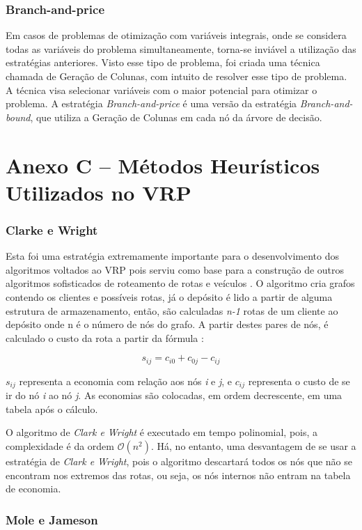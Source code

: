 \subsection*{Branch-and-price}
Em casos de problemas de otimização com variáveis integrais, onde se considera todas as variáveis do problema simultaneamente, torna-se inviável a utilização das estratégias anteriores. Visto esse tipo de problema, foi criada uma técnica chamada de Geração de Colunas, com intuito de resolver esse tipo de problema. A técnica visa selecionar variáveis com o maior potencial para otimizar o problema. A estratégia \emph{Branch-and-price} é uma versão da estratégia \emph{Branch-and-bound}, que utiliza a Geração de Colunas  em cada nó da árvore de decisão.

\chapter*{Anexo C -- Métodos Heurísticos Utilizados no VRP}
\label{anexo-metodos-heuristicos}
\subsection*{Clarke e Wright}
Esta foi uma estratégia extremamente importante para o desenvolvimento dos algoritmos voltados ao VRP pois serviu como base para a construção de outros algoritmos sofisticados de roteamento de rotas e veículos \cite{milton-nascimento}. O algoritmo cria grafos contendo os clientes e possíveis rotas, já o depósito é lido a partir de alguma estrutura de armazenamento, então, são calculadas \emph{n-1} rotas de um cliente ao depósito onde n é o número de nós do grafo. A partir destes pares de nós, é calculado  o custo da rota a partir da fórmula \cite[p. 32]{maxwell}: 

\[ s_{ij} = c_{i0} + c_{0j} - c_{ij} \]

$s_{ij}$ representa a economia com relação aos nós \emph{i} e \emph{j}, e $c_{ij}$ representa o custo de se ir do nó \emph{i} ao nó \emph{j}. As economias são colocadas, em ordem decrescente, em uma tabela após o cálculo. 

O algoritmo de \emph{Clark e Wright} é executado em tempo polinomial, pois, a complexidade é da ordem $\mathcal{O}(n^2)$. Há, no entanto, uma desvantagem de se usar a estratégia de \emph{Clark e Wright}, pois o algoritmo descartará todos os nós que não se encontram nos extremos das rotas, ou seja, os nós internos não entram na tabela de economia.
\subsection*{Mole e Jameson}

